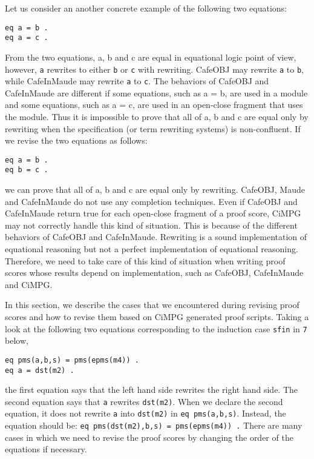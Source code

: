 \documentclass[a4paper,fleqn]{cas-dc}
\begin{document}
Let us consider an another concrete example of the following two equations:
\begin{small}
\begin{verbatim}
eq a = b .
eq a = c .
\end{verbatim}
\end{small}
From the two equations, a, b and c are equal in equational logic point of view, however, \verb!a! rewrites to either \verb!b! or \verb!c! with rewriting.
CafeOBJ may rewrite \verb!a! to \verb!b!, while CafeInMaude may rewrite \verb!a! to \verb!c!. The behaviors of CafeOBJ and CafeInMaude are different if some
equations, such as a = b, are used in a module and some equations, such as a = c, are used in an open-close fragment that uses the module. Thus it is impossible to prove that all of a, b and c are equal only by rewriting when the specification (or term rewriting systems) is non-confluent.
If we revise the two equations as follows:
\begin{small}
\begin{verbatim}
eq a = b .
eq b = c .
\end{verbatim}
\end{small}
we can prove that all of a, b and c are equal only by rewriting. CafeOBJ, Maude and CafeInMaude do not use any completion techniques. Even if CafeOBJ and CafeInMaude return true for each open-close fragment of a proof
score, CiMPG may not correctly handle this kind of situation. This is because of the different behaviors of CafeOBJ and CafeInMaude. Rewriting is a sound implementation of equational reasoning but not a perfect implementation of equational reasoning. Therefore, we need to take care of this kind of situation when writing proof scores whose results depend on implementation, such as CafeOBJ, CafeInMaude and CiMPG.

In this section, we describe the cases that we encountered during revising proof scores and how to revise them based on CiMPG generated proof scripts. Taking a look at the following two equations corresponding to the induction case \verb!sfin! in \verb!7! below,
\begin{small}
\begin{verbatim}
eq pms(a,b,s) = pms(epms(m4)) .
eq a = dst(m2) .
\end{verbatim}
\end{small}
the first equation says that the left hand side rewrites the right hand side. The second equation says that \verb!a! rewrites \verb!dst(m2)!. When we declare the second equation, it does not rewrite \verb!a! into \verb!dst(m2)! in \verb!eq pms(a,b,s)!. Instead, the equation should be: \verb!eq pms(dst(m2),b,s) = pms(epms(m4)) .! There are many cases in which we need to revise the proof scores by changing the order of the equations if necessary.
\end{document}
